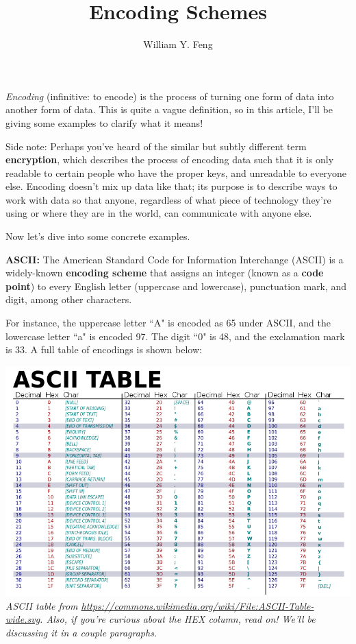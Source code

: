 \documentclass{article}
\title{Encoding Schemes}
\author{William Y. Feng}
\begin{document}
\maketitle
\textit{Encoding} (infinitive: to encode) is the process of turning one form of data into another form of data. This is quite a vague definition, so in this article, I'll be giving some examples to clarify what it means!

Side note: Perhaps you've heard of the similar but subtly different term \textbf{encryption}, which describes the process of encoding data such that it is only readable to certain people who have the proper keys, and unreadable to everyone else. Encoding doesn't mix up data like that; its purpose is to describe ways to work with data so that anyone, regardless of what piece of technology they're using or where they are in the world, can communicate with anyone else.

Now let's dive into some concrete examples.

\textbf{ASCII:}
The American Standard Code for Information Interchange (ASCII) is a widely-known \textbf{encoding scheme} that assigns an integer (known as a \textbf{code point}) to every English letter (uppercase and lowercase), punctuation mark, and digit, among other characters.

For instance, the uppercase letter ``A" is encoded as 65 under ASCII, and the lowercase letter ``a" is encoded 97. The digit ``0" is 48, and the exclamation mark is 33. A full table of encodings is shown below:

\begin{center}
    \footnotesize
    \includegraphics[width = 2 in]{images/ascii_table.png}
    \textit{ASCII table from \url{https://commons.wikimedia.org/wiki/File:ASCII-Table-wide.svg}. Also, if you're curious about the HEX column, read on! We'll be discussing it in a couple paragraphs.}
\end{center}
\end{document}
